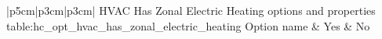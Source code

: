 \begin{customLongTable}{ |p{5cm}|p{3cm}|p{3cm}| }
{HVAC Has Zonal Electric Heating options and properties} {table:hc_opt_hvac_has_zonal_electric_heating}
{Option name & Yes & No}
\endhead
\hline
\end{customLongTable}
